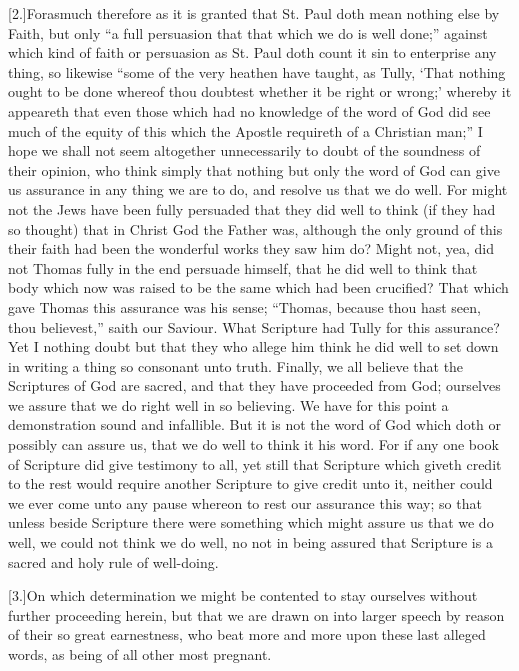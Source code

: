 [2.]Forasmuch therefore as it is granted that St. Paul doth mean nothing else by Faith, but only “a full persuasion that that which we do is well done;” against which kind of faith or persuasion as St. Paul doth count it sin to enterprise any thing, so likewise “some of the very heathen have taught, as Tully, ‘That nothing ought to be done whereof thou doubtest whether it be right or wrong;’ whereby it appeareth that even those which had no knowledge  of the word of God did see much of the equity of this which the Apostle requireth of a Christian man;” I hope we shall not seem altogether unnecessarily to doubt of the soundness of their opinion, who think simply that nothing but only the word of God can give us assurance in any thing we are to do, and resolve us that we do well. For might not the Jews have been fully persuaded that they did well to think (if they had so thought) that in Christ God the Father was, although the only ground of this their faith had been the wonderful works they saw him do? Might not, yea, did not Thomas fully in the end persuade himself, that he did well to think that body which now was raised to be the same which had been crucified? That which gave Thomas this assurance was his sense; “Thomas, because thou hast seen, thou believest,” saith our Saviour. What Scripture had Tully for this assurance? Yet I nothing doubt but that they who allege him think he did well to set down in writing a thing so consonant unto truth. Finally, we all believe that the Scriptures of God are sacred, and that they have proceeded from God; ourselves we assure that we do right well in so believing. We have for this point a demonstration sound and infallible. But it is not the word of God which doth or possibly can assure us, that we do well to think it his word. For if any one book of Scripture did give testimony to all, yet still that Scripture which giveth credit to the rest would require another Scripture to give credit unto it, neither could we ever come unto any pause whereon to rest our assurance this way; so that unless beside Scripture there were something which might assure us that we do well, we could not think we do well, no not in being assured that Scripture is a sacred and holy rule of well-doing.

[3.]On which determination we might be contented to stay ourselves without further proceeding herein, but that we are drawn on into larger speech by reason of their so great earnestness, who beat more and more upon these last alleged words, as being of all other most pregnant.

